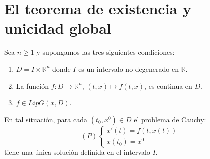 \section{El teorema de existencia y unicidad global}
\begin{theorem}
    Sea $n \geq 1$ y supongamos las tres siguientes condiciones:
    \begin{enumerate}
        \item $D = I \times \mathbb{R}^n$ donde $I$ es un intervalo no degenerado en $\mathbb{R}$.
        \item La función $f: D \to \mathbb{R}^n$, $(t, x) \mapsto f(t, x)$, es continua en $D$.
        \item $f \in LipG(x, D)$.
    \end{enumerate}
    En tal situación, para cada $(t_0, x^0) \in D$ el problema de Cauchy:
    $$(P) \begin{cases}
            x'(t) = f(t, x(t)) \\
            x(t_0) = x^0
        \end{cases}$$
    tiene una única solución definida en el intervalo $I$.
\end{theorem}